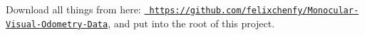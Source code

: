 Download all things from here\+: \href{https://github.com/felixchenfy/Monocular-Visual-Odometry-Data}{\texttt{ https\+://github.\+com/felixchenfy/\+Monocular-\/\+Visual-\/\+Odometry-\/\+Data}}, and put into the root of this project. 